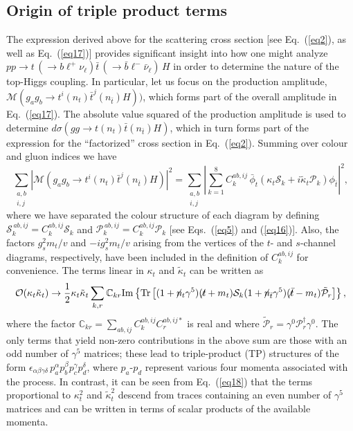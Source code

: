 \documentclass[aps,preprint,tightenlines,floatfix,superscriptaddress,nofootinbib,showpacs]{revtex4-1}
\def\beq{\begin{equation}}
\def\eeq{\end{equation}}
\def\tbslash{\tbar\hspace{-10pt}\not{}\hspace{4pt}}
\def\tslash{t\hspace{-10pt}\not{}\hspace{4pt}}
\def\nslash{n\hspace{-10pt}\not{}\hspace{4pt}}
\def\tbar{\bar{t}}
\def\bbar{\bar{b}}
\def\nubar{{\bar{\nu}}_{\ell}}
\def\ppprocess{pp\to t\,\left(\rightarrow b {\ell}^+ \nu_{\ell}\right) \tbar\,\left(\rightarrow\bbar {\ell}^-\nubar\right)\,H}
\def\kp{\kappa_t}
\def\kpt{\tilde{\kappa}_t}
\begin{document}
\subsection{Origin of triple product terms}
\label{subsec:origin}

The expression derived above for the scattering cross
section [see Eq.~(\ref{eq2}), as well as Eq.~(\ref{eq17})]
provides significant insight into
how one might analyze $\ppprocess$ in order to determine
the nature of the top-Higgs coupling.  In particular,
let us focus on the production amplitude,
$\mathcal{M}(g_ag_b \to t^i(n_t)\tbar^j(n_{\tbar})H))$, which forms
part of the overall amplitude in Eq.~(\ref{eq17}).
The absolute value squared of the production amplitude
is used to determine $d\sigma(gg\to t(n_t)\tbar (n_{\tbar})H)$,
which in turn forms part of the expression for the ``factorized'' cross section
in Eq.~(\ref{eq2}).  Summing over colour and gluon indices
we have
%
\beq
\label{eq18}
\sum_{\substack{a,b \\ i,j}}|\mathcal{M}(g_ag_b \to t^i(n_t)\tbar^j(n_{\tbar})H)|^2=\sum_{\substack{a,b \\ i,j}}\left|\sum^{8}_{k=1}C^{ab,ij}_k\,\bar{\phi}_t (\kp\mathcal{S}_k+i\kpt\mathcal{P}_k)\phi_{\tbar}\right|^2,
\eeq
%
where we have separated the colour structure of each diagram by defining
$\mathcal{S}^{\,ab,ij}_k= C^{ab,ij}_k \mathcal{S}_k$ and
$\mathcal{P}^{\,ab,ij}_k= C^{ab,ij}_k \mathcal{P}_k$
[see Eqs.~(\ref{eq5}) and (\ref{eq16})]. Also, the factors
$g^2_s m_t/v$ and $-ig^2_s m_t/v$ arising from the vertices of the $t$-
and $s$-channel diagrams, respectively, have been included in the
definition of $C^{ab,ij}_k$ for convenience. The terms linear in $\kp$
and $\kpt$ can be written as
%
\beq
\label{eq19}
\mathcal{O}(\kp\kpt)\to \frac{1}{2}\kp\kpt \sum_{k,r}\mathbb{C}_{kr}\mathrm{Im}
\left\lbrace \mathrm{Tr}\left[ (1+\nslash_t \gamma^5)(\tslash+m_t)\mathcal{S}_k(1+\nslash_{\tbar}\gamma^5
 )(\tbslash -m_t)\tilde{\mathcal{P}}_r \right] \right\rbrace ,
\eeq
%
where the factor $\mathbb{C}_{kr}=\sum_{ab,ij}C^{ab,ij}_k
C^{ab,ij*}_r$ is real and where $\tilde{\mathcal{P}}_r = \gamma^0
\mathcal{P}^{\dagger}_r \gamma^0$.
The only terms that yield non-zero contributions
in the above sum are those with an
odd number of $\gamma^5$ matrices; these lead to triple-product
(TP) structures
of the form $\epsilon_{\alpha\beta\gamma\delta}\,p^{\alpha}_ap^{\beta}_bp^{\gamma}_cp^{\delta}_d$,
where $p_a$-$p_d$ represent various four momenta associated with the process.
In contrast,
it can be seen from Eq.~(\ref{eq18}) that the terms proportional to
$\kp^2$ and $\tilde{\kappa}^2_t$ descend from traces containing
an even number of $\gamma^5$
matrices and can be written in terms of scalar products of the
available momenta.\par
\end{document}
